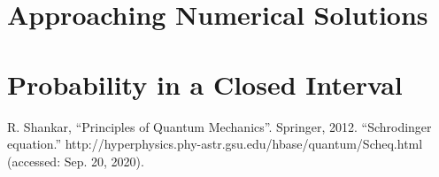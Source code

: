 \documentclass[conference]{IEEEtran}
\begin{document}
\section{Approaching Numerical Solutions}

\section{Probability in a Closed Interval}

\begin{thebibliography}{00}
	 R. Shankar, ``Principles of Quantum Mechanics''. Springer, 2012.
		“Schrodinger equation.” http://hyperphysics.phy-astr.gsu.edu/hbase/quantum/Scheq.html (accessed: Sep. 20, 2020).
\end{thebibliography}
\end{document}
